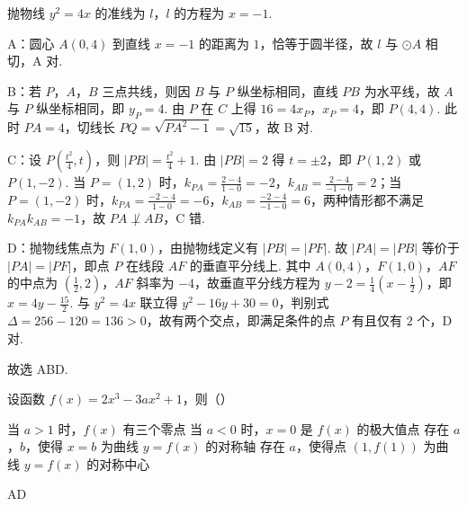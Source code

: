 \begin{solution}
抛物线 \(y^2=4x\) 的准线为 \(l\)，\(l\) 的方程为 \(x=-1\).


A：圆心 \(A(0,4)\) 到直线 \(x=-1\) 的距离为 \(1\)，恰等于圆半径，故 \(l\) 与 \(\odot A\) 相切，A 对.

B：若 \(P\)，\(A\)，\(B\) 三点共线，则因 \(B\) 与 \(P\) 纵坐标相同，直线 \(PB\) 为水平线，故 \(A\) 与 \(P\) 纵坐标相同，即 \(y_P=4\). 由 \(P\) 在 \(C\) 上得 \(16=4x_P\)，\(x_P=4\)，即 \(P(4,4)\). 此时 \(PA=4\)，切线长 \(PQ=\sqrt{PA^2-1}=\sqrt{15}\)，故 B 对.

C：设 \(P\left(\frac{t^2}{4},t\right)\)，则 \(|PB|=\frac{t^2}{4}+1\). 由 \(|PB|=2\) 得 \(t=\pm 2\)，即 \(P(1,2)\) 或 \(P(1,-2)\). 当 \(P=(1,2)\) 时，\(k_{PA}=\frac{2-4}{1-0}=-2\)，\(k_{AB}=\frac{2-4}{-1-0}=2\)；当 \(P=(1,-2)\) 时，\(k_{PA}=\frac{-2-4}{1-0}=-6\)，\(k_{AB}=\frac{-2-4}{-1-0}=6\)，两种情形都不满足 \(k_{PA}k_{AB}=-1\)，故 \(PA\not\perp AB\)，C 错.

D：抛物线焦点为 \(F(1,0)\)，由抛物线定义有 \(|PB|=|PF|\). 故 \(|PA|=|PB|\) 等价于 \(|PA|=|PF|\)，即点 \(P\) 在线段 \(AF\) 的垂直平分线上. 其中 \(A(0,4)\)，\(F(1,0)\)，\(AF\) 的中点为 \(\left(\frac12,2\right)\)，\(AF\) 斜率为 \(-4\)，故垂直平分线方程为 \(y-2=\frac14\left(x-\frac12\right)\)，即 \(x=4y-\frac{15}{2}\). 与 \(y^2=4x\) 联立得 \(y^2-16y+30=0\)，判别式 \(\Delta=256-120=136>0\)，故有两个交点，即满足条件的点 \(P\) 有且仅有 \(2\) 个，D 对.

故选 ABD.
\end{solution}

\begin{problem}
设函数 \(f(x)=2x^3-3ax^2+1\)，则（\quad）

\choices
    {当 \(a>1\) 时，\(f(x)\) 有三个零点}
    {当 \(a<0\) 时，\(x=0\) 是 \(f(x)\) 的极大值点}
    {存在 \(a\)，\(b\)，使得 \(x=b\) 为曲线 \(y=f(x)\) 的对称轴}
    {存在 \(a\)，使得点 \((1,f(1))\) 为曲线 \(y=f(x)\) 的对称中心}
\end{problem}

\begin{answer}
AD
\end{answer}

